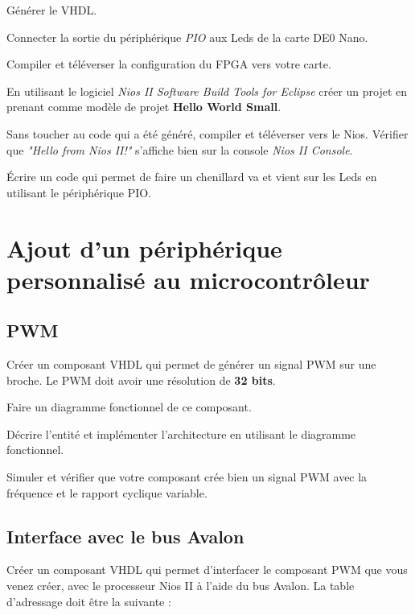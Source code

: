 \medskip

Générer le VHDL.

\medskip

Connecter la sortie du périphérique \textit{PIO} aux Leds de la carte DE0 Nano.

\medskip

Compiler et téléverser la configuration du FPGA vers votre carte.

\medskip

En utilisant le logiciel \textit{Nios II Software Build Tools for Eclipse} créer un projet en prenant comme modèle de projet \textbf{Hello World Small}.

\medskip

Sans toucher au code qui a été généré, compiler et téléverser vers le Nios. Vérifier que \textit{"Hello from Nios II!"} s'affiche bien sur la console \textit{Nios II Console}.

\medskip

Écrire un code qui permet de faire un chenillard va et vient sur les Leds en utilisant le périphérique PIO.

\section{Ajout d'un périphérique personnalisé au microcontrôleur}
\subsection{PWM}
Créer un composant VHDL qui permet de générer un signal PWM sur une broche. Le PWM doit avoir une résolution de \textbf{32 bits}.

\medskip

Faire un diagramme fonctionnel de ce composant.

\medskip

Décrire l'entité et implémenter l'architecture en utilisant le diagramme fonctionnel.

\medskip

Simuler et vérifier que votre composant crée bien un signal PWM avec la fréquence et le rapport cyclique variable.

\subsection{Interface avec le bus Avalon}

Créer un composant VHDL qui permet d'interfacer le composant PWM que vous venez créer, avec le processeur Nios II à l'aide du bus Avalon. La table d'adressage doit être la suivante :

